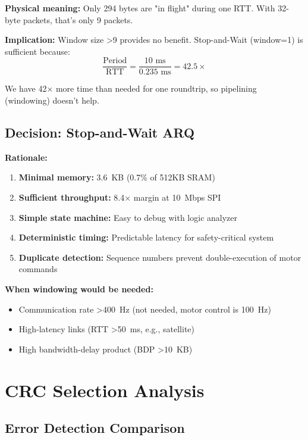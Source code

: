 \documentclass[12pt,letterpaper]{article}
\begin{document}
\textbf{Physical meaning:} Only 294 bytes are "in flight" during one RTT. With 32-byte packets, that's only 9 packets.

\textbf{Implication:} Window size >9 provides no benefit. Stop-and-Wait (window=1) is sufficient because:
\begin{equation}
\frac{\text{Period}}{\text{RTT}} = \frac{10 \text{ ms}}{0.235 \text{ ms}} = 42.5×
\end{equation}

We have 42× more time than needed for one roundtrip, so pipelining (windowing) doesn't help.

\subsection{Decision: Stop-and-Wait ARQ}

\textbf{Rationale:}
\begin{enumerate}
    \item \textbf{Minimal memory:} 3.6~KB (0.7\% of 512KB SRAM)
    \item \textbf{Sufficient throughput:} 8.4× margin at 10~Mbps SPI
    \item \textbf{Simple state machine:} Easy to debug with logic analyzer
    \item \textbf{Deterministic timing:} Predictable latency for safety-critical system
    \item \textbf{Duplicate detection:} Sequence numbers prevent double-execution of motor commands
\end{enumerate}

\textbf{When windowing would be needed:}
\begin{itemize}
    \item Communication rate >400~Hz (not needed, motor control is 100~Hz)
    \item High-latency links (RTT >50~ms, e.g., satellite)
    \item High bandwidth-delay product (BDP >10~KB)
\end{itemize}

\section{CRC Selection Analysis}

\subsection{Error Detection Comparison}
\end{document}
